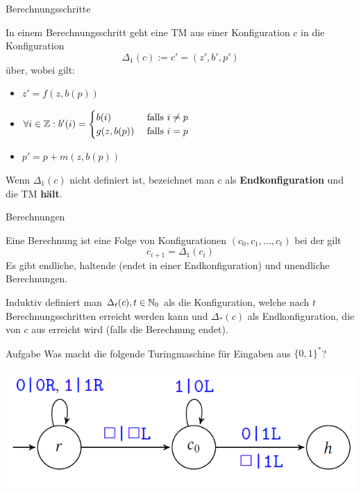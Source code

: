 \begin{frame}{Berechnungsschritte}
	\begin{Definition}
		In einem Berechnungsschritt geht eine TM aus einer Konfiguration $c$ 
		in die Konfiguration $$\Delta_1(c) := c' = (z',b',p')$$ über, wobei gilt:
		\begin{itemize}[<+->]
			\item $z' = f(z,b(p))$
			\item $\forall i\in \mathbb{Z}: b'(i) =
			\begin{cases}
			b(i) & \text{ falls } i\not=p \\
			g(z,b(p)) & \text{ falls } i=p
			\end{cases}$
			\item $p' = p + m(z,b(p))$
		\end{itemize}
		\bigskip
		
		\pause
		Wenn $\Delta_1(c)$ nicht definiert ist, bezeichnet man $c$ als \textbf{Endkonfiguration} und die TM \textbf{hält}.
	\end{Definition}
\end{frame}

\begin{frame}{Berechnungen}
	\begin{Definition}
		Eine Berechnung ist eine Folge von Konfigurationen $(c_0, c_1, ..., c_t)$ bei der gilt $$c_{i+1} = \Delta_1(c_i)$$ \pause
		Es gibt endliche, haltende (endet in einer Endkonfiguration) und unendliche Berechnungen.
		\bigskip
		
		\pause
		Induktiv definiert man $\Delta_t(c) , t\in\mathbb{N}_0$ als die Konfiguration, welche nach $t$ Berechnungsschritten erreicht werden kann und $\Delta_*(c)$ als Endkonfiguration, die von $c$ aus erreicht wird (falls die Berechnung endet).
	\end{Definition}
\end{frame}

\begin{frame}{Aufgabe}
	Was macht die folgende Turingmaschine für Eingaben aus $\{0, 1\}^*$?
	
	\smallskip
	\includegraphics[scale=0.65]{turing/addBin1}
	
	\smallskip
\end{frame}


